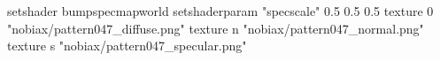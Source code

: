 setshader bumpspecmapworld
setshaderparam "specscale" 0.5 0.5 0.5
   texture 0 "nobiax/pattern047_diffuse.png"
   texture n "nobiax/pattern047_normal.png"
   texture s "nobiax/pattern047_specular.png"